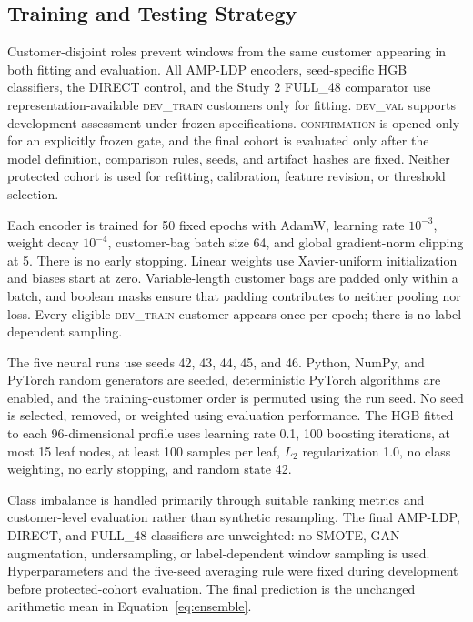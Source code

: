 \subsection{Training and Testing Strategy}\label{sec:training}

Customer-disjoint roles prevent windows from the same customer appearing in both fitting and evaluation. All AMP-LDP encoders, seed-specific HGB classifiers, the DIRECT control, and the Study 2 FULL\_48 comparator use representation-available \textsc{dev\_train} customers only for fitting. \textsc{dev\_val} supports development assessment under frozen specifications. \textsc{confirmation} is opened only for an explicitly frozen gate, and the final cohort is evaluated only after the model definition, comparison rules, seeds, and artifact hashes are fixed. Neither protected cohort is used for refitting, calibration, feature revision, or threshold selection.

Each encoder is trained for 50 fixed epochs with AdamW, learning rate $10^{-3}$, weight decay $10^{-4}$, customer-bag batch size 64, and global gradient-norm clipping at 5. There is no early stopping. Linear weights use Xavier-uniform initialization and biases start at zero. Variable-length customer bags are padded only within a batch, and boolean masks ensure that padding contributes to neither pooling nor loss. Every eligible \textsc{dev\_train} customer appears once per epoch; there is no label-dependent sampling.

The five neural runs use seeds 42, 43, 44, 45, and 46. Python, NumPy, and PyTorch random generators are seeded, deterministic PyTorch algorithms are enabled, and the training-customer order is permuted using the run seed. No seed is selected, removed, or weighted using evaluation performance. The HGB fitted to each 96-dimensional profile uses learning rate 0.1, 100 boosting iterations, at most 15 leaf nodes, at least 100 samples per leaf, $L_2$ regularization 1.0, no class weighting, no early stopping, and random state 42.

Class imbalance is handled primarily through suitable ranking metrics and customer-level evaluation rather than synthetic resampling. The final AMP-LDP, DIRECT, and FULL\_48 classifiers are unweighted: no SMOTE, GAN augmentation, undersampling, or label-dependent window sampling is used. Hyperparameters and the five-seed averaging rule were fixed during development before protected-cohort evaluation. The final prediction is the unchanged arithmetic mean in Equation~\ref{eq:ensemble}.

